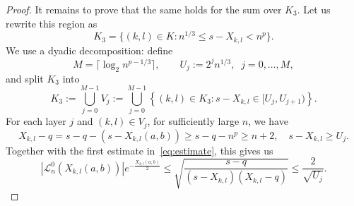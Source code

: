 \documentclass[10pt,a4paper]{amsart}
\begin{document}
\begin{proof}
    It remains to prove that the same holds for the sum over $K_3$. Let us rewrite this region as
    \begin{equation}
        K_3 = \{(k,l)\in K: n^{1/3} \leq s - X_{k,l} < n^{p}\}.
    \end{equation}
    We use a dyadic decomposition: define
    \begin{equation}
        M=\lceil \log_2 n^{p-1/3}\rceil , \qquad U_j:=2^j n^{1/3}, \,\,\ j=0,\dots,M,
    \end{equation}
    and split $K_3$ into 
    \begin{equation}
        K_3:=\bigcup\limits_{j=0}^{M-1} V_j := \bigcup\limits_{j=0}^{M-1} \left\{ (k,l) \in K_3: s-X_{k,l} \in [U_j, U_{j+1})  \right\}.
    \end{equation}
    For each layer $j$ and $(k,l)\in V_j$, for sufficiently large $n$, we have
    \begin{equation}
        X_{k,l}-q = s-q-(s-X_{k,l}(a,b)) \geq s-q-n^p \geq n+2, \quad s-X_{k,l}\geq U_j.
    \end{equation}
    Together with the first estimate in~\eqref{eq:estimate}, this gives us
    \begin{equation}\label{eq:Laguerre_on_dyadic_layer}
        |\mathcal{L}_n^{0}(X_{k,l}(a,b))|e^{-\frac{X_{k,l}(a,b)}{2}} \leq  \sqrt{\frac{s-q}{(s-X_{k,l})(X_{k,l}-q)}} \leq \frac{2}{\sqrt{U_j}}.
    \end{equation}


\end{proof}
\end{document}
